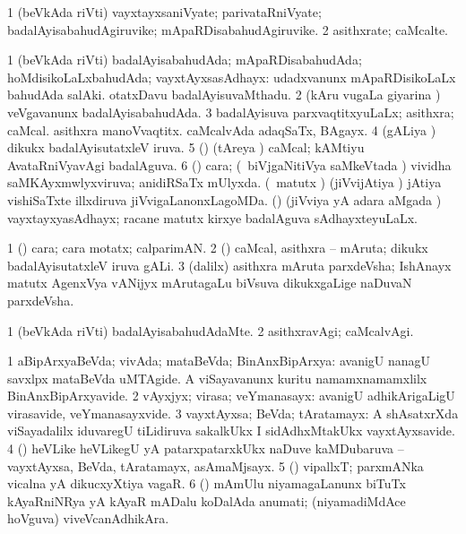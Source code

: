 \bentry
{} 
\gl{\nA}
\expl{}
\bmng
\bnum
\num{1} (beVkAda riVti) vayxtayxsaniVyate; parivataRniVyate; badalAyisabahudAgiruvike; mApaRDisabahudAgiruvike. 
\num{2} asithxrate; caMcalte. 
\enum
\emng
\eentry

\bentry
{} 
\gl{\gu}
\expl{}
\bmng
\bnum
\num{1} (beVkAda riVti) badalAyisabahudAda; mApaRDisabahudAda; hoMdisikoLaLxbahudAda; vayxtAyxsasAdhayx:  udadxvanunx mApaRDisikoLaLx bahudAda salAki.  otatxDavu badalAyisuvaMthadu. 
\num{2} (kAru \mo vugaLa giyarina \vi) veVgavanunx badalAyisabahudAda. 
\num{3} badalAyisuva parxvaqtitxyuLaLx; asithxra; caMcal.  asithxra manoVvaqtitx.  caMcalvAda adaqSaTx, BAgayx. 
\num{4} (gALiya \vi) dikukx badalAyisutatxleV iruva. 
\num{5} (\Kavi) (tAreya \vi) caMcal; kAMtiyu AvataRniVyavAgi badalAguva. 
\num{6} (\ga) cara; (\sA\ biVjgaNitiVya saMkeVtada \vi) vividha saMKAyxmwlyxviruva; anidiRSaTx mUlyxda. 
\banum
{} (\jiVvi\ matutx \savi) (jiVvijAtiya \vi) jAtiya vishiSaTxte illxdiruva jiVvigaLanonxLagoMDa. 
 (\jiVvi) (jiVviya yA adara aMgada \vi) vayxtayxyasAdhayx; racane matutx kirxye badalAguva sAdhayxteyuLaLx. 
\eanum
\numie
\enum
\emng
\eentry

\bentry
{} 
\gl{\nA}
\expl{}
\bmng
\bnum
\num{1} (\ga) cara; cara motatx; calparimAN. 
\num{2} (\nw) caMcal, asithxra -- mAruta; dikukx badalAyisutatxleV iruva gALi. 
\num{3} (\bava dalilx) asithxra mAruta parxdeVsha; IshAnayx matutx AgenxVya vANijyx mArutagaLu biVsuva dikukxgaLige naDuvaN parxdeVsha. 
\enum
\emng
\eentry

\bentry
{} 
\gl{\nA}
\expl{}
\bmng
\emng
\eentry

\bentry
{} 
\gl{\kirxvi}
\expl{}
\bmng
\bnum
\num{1} (beVkAda riVti) badalAyisabahudAdaMte. 
\num{2} asithxravAgi; caMcalvAgi. 
\enum
\emng
\eentry

\bentry
{} 
\gl{\nA}
\expl{}
\bmng
\bnum
\num{1} aBipArxyaBeVda; vivAda; mataBeVda; BinAnxBipArxya:  avanigU nanagU savxlpx mataBeVda uMTAgide.  A viSayavanunx kuritu namamxnamamxlilx BinAnxBipArxyavide. 
\num{2} vAyxjyx; virasa; veYmanasayx:  avanigU adhikArigaLigU virasavide, veYmanasayxvide. 
\num{3} vayxtAyxsa; BeVda; tAratamayx:  A shAsatxrXda viSayadalilx iduvaregU tiLidiruva sakalkUkx I sidAdhxMtakUkx vayxtAyxsavide. 
\num{4} (\nAyxshA) heVLike heVLikegU yA patarxpatarxkUkx naDuve kaMDubaruva -- vayxtAyxsa, BeVda, tAratamayx, asAmaMjsayx. 
\num{5} (\saMshA) vipallxT; parxmANka vicalna yA dikucxyXtiya  vagaR. 
\num{6} (\ame) mAmUlu niyamagaLanunx biTuTx kAyaRniNRya yA kAyaR mADalu koDalAda anumati; (niyamadiMdAce hoVguva) viveVcanAdhikAra. 
\enum
\emng
\eentry

